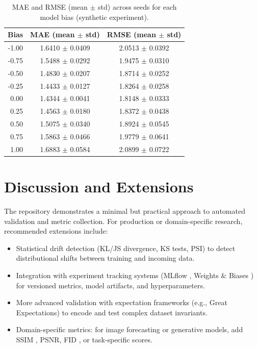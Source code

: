 \documentclass[11pt]{article}
\begin{document}
\begin{table}[ht]
\centering
\begin{tabular}{rcc}
\toprule
Bias & MAE (mean $\pm$ std) & RMSE (mean $\pm$ std)\\
\midrule
-1.00 & 1.6410 $\pm$ 0.0409 & 2.0513 $\pm$ 0.0392\\
-0.75 & 1.5488 $\pm$ 0.0292 & 1.9475 $\pm$ 0.0310\\
-0.50 & 1.4830 $\pm$ 0.0207 & 1.8714 $\pm$ 0.0252\\
-0.25 & 1.4433 $\pm$ 0.0127 & 1.8264 $\pm$ 0.0258\\
0.00 & 1.4344 $\pm$ 0.0041 & 1.8148 $\pm$ 0.0333\\
0.25 & 1.4563 $\pm$ 0.0180 & 1.8372 $\pm$ 0.0438\\
0.50 & 1.5075 $\pm$ 0.0340 & 1.8924 $\pm$ 0.0545\\
0.75 & 1.5863 $\pm$ 0.0466 & 1.9779 $\pm$ 0.0641\\
1.00 & 1.6883 $\pm$ 0.0584 & 2.0899 $\pm$ 0.0722\\
\bottomrule
\end{tabular}
\caption{MAE and RMSE (mean $\pm$ std) across seeds for each model bias (synthetic experiment).}
\label{tab:summary}
\end{table}

\section{Discussion and Extensions}
The repository demonstrates a minimal but practical approach to automated validation and metric collection. For production or domain-specific research, recommended extensions include:
\begin{itemize}
  \item Statistical drift detection (KL/JS divergence, KS tests, PSI) to detect distributional shifts between training and incoming data.
  \item Integration with experiment tracking systems (MLflow \cite{mlflow}, Weights & Biases \cite{wandb}) for versioned metrics, model artifacts, and hyperparameters.
  \item More advanced validation with expectation frameworks (e.g., Great Expectations) to encode and test complex dataset invariants.
  \item Domain-specific metrics: for image forecasting or generative models, add SSIM \cite{ssim}, PSNR, FID \cite{fid}, or task-specific scores.
\end{itemize}
\end{document}
